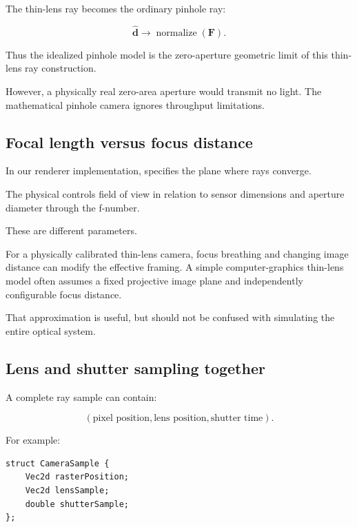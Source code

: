The thin-lens ray becomes the ordinary pinhole ray:

\[ \boxed{ \hat{\mathbf d} \to \operatorname{normalize}(\mathbf F). } \]

Thus the idealized pinhole model is the zero-aperture geometric limit of this thin-lens ray construction.

However, a physically real zero-area aperture would transmit no light. The mathematical pinhole camera ignores throughput limitations.

\subsection{Focal length versus focus distance}\label{02-foundations-ii-ch036-focal-length-versus-focus-distance}

\hypertarget{02-foundations-ii-ch036-focal-length-versus-focus-distance}{}

In our renderer implementation,  specifies the plane where rays converge.

The physical  controls field of view in relation to sensor dimensions and aperture diameter through the f-number.

These are different parameters.

For a physically calibrated thin-lens camera, focus breathing and changing image distance can modify the effective framing. A simple computer-graphics thin-lens model often assumes a fixed projective image plane and independently configurable focus distance.

That approximation is useful, but should not be confused with simulating the entire optical system.

\subsection{Lens and shutter sampling together}\label{02-foundations-ii-ch036-lens-and-shutter-sampling-together}

\hypertarget{02-foundations-ii-ch036-lens-and-shutter-sampling-together}{}

A complete ray sample can contain:

\[ \boxed{ (\text{pixel position}, \text{lens position}, \text{shutter time}) }. \]

For example:

\begin{verbatim}
struct CameraSample {
    Vec2d rasterPosition;
    Vec2d lensSample;
    double shutterSample;
};
\end{verbatim}


